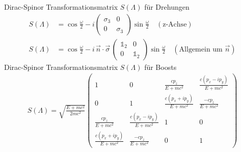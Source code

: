 




{\Huge
Dirac-Spinor Transformationsmatrix \(S(\Lambda)\) für Drehungen
\begin{align*}
 S(\Lambda)&= \cos\frac{\omega}{2}-i  \begin{pmatrix}\sigma_3&0\\0&\sigma_3\end{pmatrix}\sin\frac{\omega}{2}\quad (\text{z-Achse})\\
S(\Lambda) &= \cos\frac{\omega}{2}-i\, \vec n\cdot\vec\sigma\,\begin{pmatrix}\mathds 1_2&0\\0&\mathds 1_2\end{pmatrix}\sin\frac{\omega}{2}\quad (\text{Allgemein um }\vec n)
\end{align*}
Dirac-Spinor Transformationsmatrix \(S(\Lambda)\) für Boosts
\begin{align*}
  S(\Lambda)=\sqrt{\frac{E + mc^2}{2mc^2}}
  \begin{pmatrix}
    1&0&\frac{cp_z}{E+mc^2}&\frac{c(p_x-ip_y)}{E+mc^2}\\
    0&1&\frac{c(p_x+ip_y)}{E+mc^2}&\frac{-cp_z}{E+mc^2}\\
    \frac{cp_z}{E+mc^2}&\frac{c(p_x-ip_y)}{E+mc^2}&1&0\\
    \frac{c(p_x+ip_y)}{E+mc^2}&\frac{-cp_z}{E+mc^2}&0&1
  \end{pmatrix}
\end{align*}

}%

